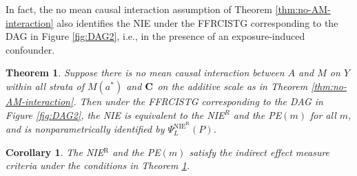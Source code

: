 \documentclass[12pt]{article}
\newtheorem{theorem}{Theorem}
\newtheorem{corollary}{Corollary}
\begin{document}
In fact, the no mean causal interaction assumption of Theorem \ref{thm:no-AM-interaction} also identifies the NIE under the FFRCISTG corresponding to the DAG in Figure \ref{fig:DAG2}, i.e., in the presence of an exposure-induced confounder.
\begin{theorem}
    \label{thm:no-AM-interaction-recanting-witness}
    Suppose there is no mean %
    causal interaction between $A$ and $M$ on $Y$ within all strata of $M(a^*)$ and $\bf C$ on the additive scale as in Theorem \ref{thm:no-AM-interaction}. %
    Then under the FFRCISTG corresponding to the DAG in Figure \ref{fig:DAG2}, the NIE is equivalent to the NIE$^{R}$ and the PE$(m)$ for all $m$, and is nonparametrically identified by $\Psi^{\text{NIE}^{\text{R}}}_{L}(P)$.
\end{theorem}
\begin{corollary}
    \label{cor:no-AM-interaction-recanting-witness}
    The NIE$^{\text{R}}$ and the PE$(m)$ satisfy the indirect effect measure criteria under the conditions in Theorem \ref{thm:no-AM-interaction-recanting-witness}.
\end{corollary}
\end{document}
